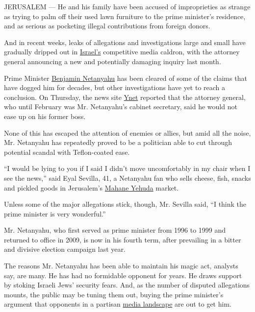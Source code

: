 JERUSALEM --- He and his family have been accused of improprieties as
strange as trying to palm off their used lawn furniture to the prime
minister's residence, and as serious as pocketing illegal contributions
from foreign donors.

And in recent weeks, leaks of allegations and investigations large and
small have gradually dripped out in
\href{http://www.nytimes3xbfgragh.onion/topic/destination/israel?inline=nyt-geo}{Israel's}
competitive media caldron, with the attorney general announcing a new
and potentially damaging inquiry last month.

Prime Minister
\href{http://www.nytimes3xbfgragh.onion/topic/person/benjamin-netanyahu?8qa}{Benjamin
Netanyahu} has been cleared of some of the claims that have dogged him
for decades, but other investigations have yet to reach a conclusion. On
Thursday, the news site
\href{http://www.ynetnews.com/home/0,7340,L-3083,00.html}{Ynet} reported
that the attorney general, who until February was Mr. Netanyahu's
cabinet secretary, said he would not ease up on his former boss.

None of this has escaped the attention of enemies or allies, but amid
all the noise, Mr. Netanyahu has repeatedly proved to be a politician
able to cut through potential scandal with Teflon-coated ease.

``I would be lying to you if I said I didn't move uncomfortably in my
chair when I see the news,'' said Eyal Sevilla, 41, a Netanyahu fan who
sells cheese, fish, snacks and pickled goods in Jerusalem's
\href{http://en.machne.co.il/}{Mahane Yehuda} market.

Unless some of the major allegations stick, though, Mr. Sevilla said,
``I think the prime minister is very wonderful.''

Mr. Netanyahu, who first served as prime minister from 1996 to 1999 and
returned to office in 2009, is now in his fourth term, after prevailing
in a bitter and divisive election campaign last year.

The reasons Mr. Netanyahu has been able to maintain his magic act,
analysts say, are many. He has had no formidable opponent for years. He
draws support by stoking Israeli Jews' security fears. And, as the
number of disputed allegations mounts, the public may be tuning them
out, buying the prime minister's argument that opponents in a partisan
\href{http://www.nytimes3xbfgragh.onion/2016/07/31/opinion/sunday/how-benjamin-netanyahu-is-crushing-israels-free-press.html?rref=collection\%2Ftimestopic\%2FIsrael\&action=click\&contentCollection=world\&region=stream\&module=stream_unit\&version=latest\&contentPlacement=1\&pgtype=collection}{media
landscape} are out to get him.

